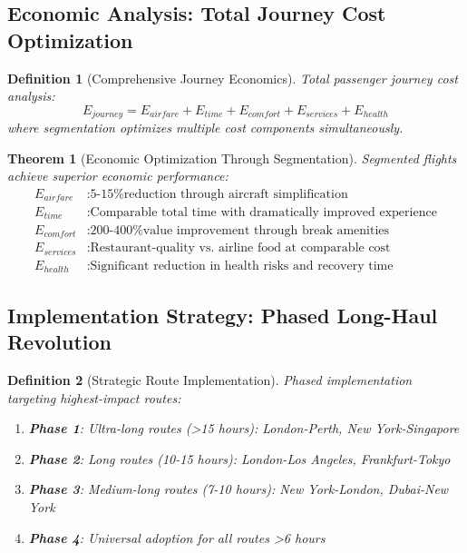 \documentclass[12pt,a4paper]{article}
\newtheorem{theorem}{Theorem}
\newtheorem{definition}{Definition}
\begin{document}
\subsection{Economic Analysis: Total Journey Cost Optimization}

\begin{definition}[Comprehensive Journey Economics]
Total passenger journey cost analysis:
\begin{equation}
E_{journey} = E_{airfare} + E_{time} + E_{comfort} + E_{services} + E_{health}
\end{equation}
where segmentation optimizes multiple cost components simultaneously.
\end{definition}

\begin{theorem}[Economic Optimization Through Segmentation]
Segmented flights achieve superior economic performance:
\begin{align}
E_{airfare} &: \text{5-15\% reduction through aircraft simplification} \\
E_{time} &: \text{Comparable total time with dramatically improved experience} \\
E_{comfort} &: \text{200-400\% value improvement through break amenities} \\
E_{services} &: \text{Restaurant-quality vs. airline food at comparable cost} \\
E_{health} &: \text{Significant reduction in health risks and recovery time}
\end{align}
\end{theorem}

\subsection{Implementation Strategy: Phased Long-Haul Revolution}

\begin{definition}[Strategic Route Implementation]
Phased implementation targeting highest-impact routes:
\begin{enumerate}
\item \textbf{Phase 1}: Ultra-long routes (>15 hours): London-Perth, New York-Singapore
\item \textbf{Phase 2}: Long routes (10-15 hours): London-Los Angeles, Frankfurt-Tokyo  
\item \textbf{Phase 3}: Medium-long routes (7-10 hours): New York-London, Dubai-New York
\item \textbf{Phase 4}: Universal adoption for all routes >6 hours
\end{enumerate}
\end{definition}
\end{document}
